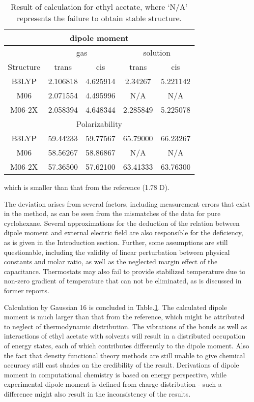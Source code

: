 \documentclass[%
 reprint,
 amsmath,amssymb,
 aps,
10.5pt,
]{revtex4-1}
\begin{document}
\begin{table}
\centering
\caption{Result of calculation for ethyl acetate, where `N/A' represents the failure to obtain stable structure.}
\begin{tabular}{c|cccc}\hline
\multicolumn{5}{c}{dipole moment}\\\hline
 & \multicolumn{2}{c}{gas} & \multicolumn{2}{c}{solution}  \\\hline
Structure & trans & cis & trans & cis \\
B3LYP & 2.106818 & 4.625914 & 2.34267 & 5.221142 \\
M06 & 2.071554 & 4.495996 & N/A & N/A \\
M06-2X & 2.058394 & 4.648344 & 2.285849 & 5.225078 \\\hline
\multicolumn{5}{c}{Polarizability}\\\hline
B3LYP & 59.44233 & 59.77567 & 65.79000 & 66.23267 \\
M06 & 58.56267 & 58.86867 & N/A & N/A \\
M06-2X & 57.36500 & 57.62100 & 63.41333 & 63.76300 \\\hline
\end{tabular}
\label{calc}
\end{table}
which is smaller than that from the reference (1.78 D).

The deviation arises from several factors, including measurement errors that exist in the method, as can be seen from the mismatches of the data for pure cyclohexane. Several approximations for the deduction of the relation between dipole moment and external electric field are also responsible for the deficiency, as is given in the Introduction section. Further, some assumptions are still questionable, including the validity of linear perturbation between physical constants and molar ratio, as well as the neglected margin effect of the capacitance. Thermostats may also fail to provide stabilized temperature due to non-zero gradient of temperature that can not be eliminated, as is discussed in former reports.

Calculation by Gaussian 16 is concluded in Table.\ref{calc}. The calculated dipole moment is much larger than that from the reference, which might be attributed to neglect of thermodynamic distribution. The vibrations of the bonds as well as interactions of ethyl acetate with solvents will result in a distributed occupation of energy states, each of which contributes differently to the dipole moment. Also the fact that density functional theory methods are still unable to give chemical accuracy still cast shades on the credibility of the result. Derivations of dipole moment in computational chemistry is based on energy perspective, while experimental dipole moment is defined from charge distribution - such a difference might also result in the inconsistency of the results.
\end{document}
